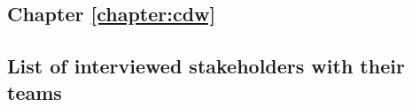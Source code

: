 \documentclass[french,12pt,twoside,a4paper]{book}
\let\fontnumber\relax
\renewcommand{\thesection}{\fontnumber{\color{chaptercolor}\arabic{chapter}.}\arabic{section}}
\renewcommand{\thesubsection}{\fontnumber{\color{chaptercolor}\arabic{chapter}.}\arabic{section}.\arabic{subsection}}
\begin{document}
\begin{appendices}
  \chapter{Chapter \ref{chapter:cdw}}\label{apd:cdw}

  \section{List of interviewed stakeholders with their
    teams}\label{apd:cdw:table:expert_teams}


\end{appendices}
\end{document}

